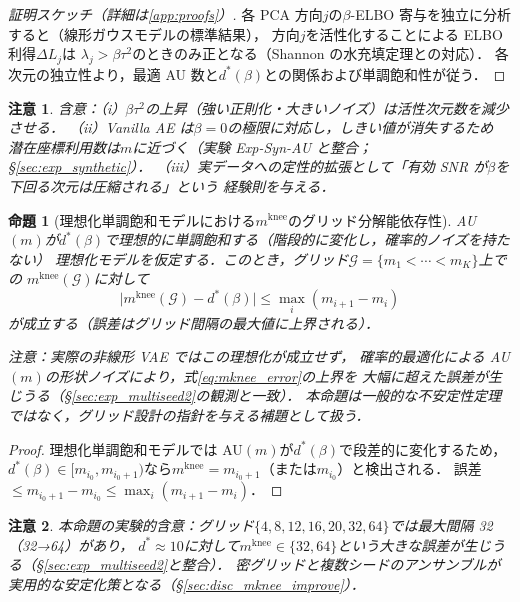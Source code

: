 \documentclass[11pt,a4paper]{jsarticle}
\newtheorem{proposition}{命題}
\newtheorem{remark}{注意}
\newcommand{\mknee}{m^{\mathrm{knee}}}
\begin{document}
\begin{proof}[証明スケッチ（詳細は\ref{app:proofs}）]
各 PCA 方向$j$の$\beta$-ELBO 寄与を独立に分析すると（線形ガウスモデルの標準結果），
方向$j$を活性化することによる ELBO 利得$\Delta L_j$は
$\lambda_j > \beta\tau^2$のときのみ正となる（Shannon の水充填定理との対応）．
各次元の独立性より，最適 AU 数と$d^*(\beta)$との関係および単調飽和性が従う．
\end{proof}

\begin{remark}
含意：（i）$\beta\tau^2$の上昇（強い正則化・大きいノイズ）は活性次元数を減少させる．
（ii）Vanilla AE は$\beta = 0$の極限に対応し，しきい値が消失するため
潜在座標利用数は$m$に近づく（実験 Exp-Syn-AU と整合；§\ref{sec:exp_synthetic}）．
（iii）実データへの定性的拡張として「有効 SNR が$\beta$を下回る次元は圧縮される」という
経験則を与える．
\end{remark}

\begin{proposition}[理想化単調飽和モデルにおける$\mknee$のグリッド分解能依存性]\label{thm:mknee_instab}
AU$(m)$が$d^*(\beta)$で理想的に単調飽和する（階段的に変化し，確率的ノイズを持たない）
理想化モデルを仮定する．このとき，グリッド$\mathcal{G} = \{m_1 < \cdots < m_K\}$上での
$\mknee(\mathcal{G})$に対して
\begin{equation}
  \bigl|\mknee(\mathcal{G}) - d^*(\beta)\bigr|
  \leq \max_{i} (m_{i+1} - m_i)
  \label{eq:mknee_error}
\end{equation}
が成立する（誤差はグリッド間隔の最大値に上界される）．

\noindent\textit{注意：実際の非線形 VAE ではこの理想化が成立せず，
確率的最適化による AU$(m)$の形状ノイズにより，式\eqref{eq:mknee_error}の上界を
大幅に超えた誤差が生じうる（§\ref{sec:exp_multiseed2}の観測と一致）．
本命題は一般的な不安定性定理ではなく，グリッド設計の指針を与える補題として扱う．}
\end{proposition}

\begin{proof}
理想化単調飽和モデルでは AU$(m)$が$d^*(\beta)$で段差的に変化するため，
$d^*(\beta) \in [m_{i_0}, m_{i_0+1})$なら$\mknee = m_{i_0+1}$（または$m_{i_0}$）と検出される．
誤差$\leq m_{i_0+1} - m_{i_0} \leq \max_i(m_{i+1}-m_i)$．
\end{proof}

\begin{remark}
本命題の実験的含意：グリッド$\{4,8,12,16,20,32,64\}$では最大間隔 32（32→64）があり，
$d^* \approx 10$に対して$\mknee \in \{32, 64\}$という大きな誤差が生じうる（§\ref{sec:exp_multiseed2}と整合）．
密グリッドと複数シードのアンサンブルが実用的な安定化策となる（§\ref{sec:disc_mknee_improve}）．
\end{remark}
\end{document}
